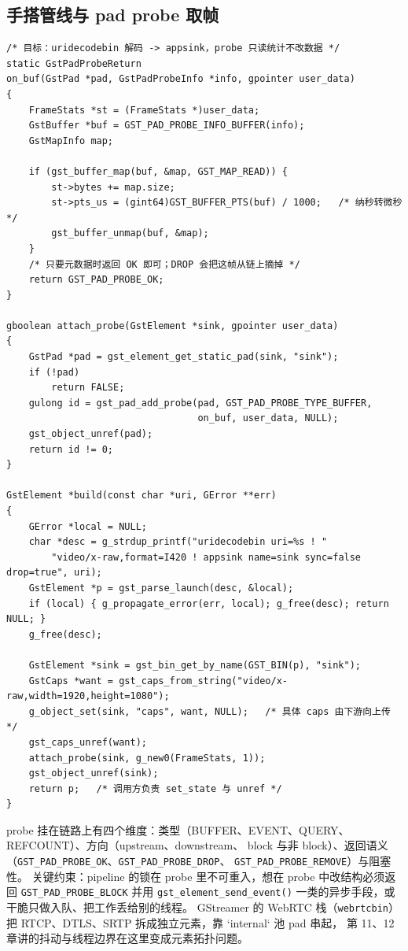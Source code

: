 \documentclass[12pt,a4paper,fontset=fandol]{ctexbook}
\newcommand{\Fn}[1]{\texttt{#1()}}
\newcommand{\Tp}[1]{\texttt{#1}}
\newcommand{\Bk}{\discretionary{}{}{}}
\begin{document}
\subsection*
{手搭管线与 pad probe 取帧}
\begin{lstlisting}[style=cstyle,caption={GStreamer：手搭管线、在 sink pad 上挂 probe 取帧并读取时钟},label={lst:ch13-gst-probe}]
/* 目标：uridecodebin 解码 -> appsink，probe 只读统计不改数据 */
static GstPadProbeReturn
on_buf(GstPad *pad, GstPadProbeInfo *info, gpointer user_data)
{
    FrameStats *st = (FrameStats *)user_data;
    GstBuffer *buf = GST_PAD_PROBE_INFO_BUFFER(info);
    GstMapInfo map;

    if (gst_buffer_map(buf, &map, GST_MAP_READ)) {
        st->bytes += map.size;
        st->pts_us = (gint64)GST_BUFFER_PTS(buf) / 1000;   /* 纳秒转微秒 */
        gst_buffer_unmap(buf, &map);
    }
    /* 只要元数据时返回 OK 即可；DROP 会把这帧从链上摘掉 */
    return GST_PAD_PROBE_OK;
}

gboolean attach_probe(GstElement *sink, gpointer user_data)
{
    GstPad *pad = gst_element_get_static_pad(sink, "sink");
    if (!pad)
        return FALSE;
    gulong id = gst_pad_add_probe(pad, GST_PAD_PROBE_TYPE_BUFFER,
                                  on_buf, user_data, NULL);
    gst_object_unref(pad);
    return id != 0;
}

GstElement *build(const char *uri, GError **err)
{
    GError *local = NULL;
    char *desc = g_strdup_printf("uridecodebin uri=%s ! "
        "video/x-raw,format=I420 ! appsink name=sink sync=false drop=true", uri);
    GstElement *p = gst_parse_launch(desc, &local);
    if (local) { g_propagate_error(err, local); g_free(desc); return NULL; }
    g_free(desc);

    GstElement *sink = gst_bin_get_by_name(GST_BIN(p), "sink");
    GstCaps *want = gst_caps_from_string("video/x-raw,width=1920,height=1080");
    g_object_set(sink, "caps", want, NULL);   /* 具体 caps 由下游向上传 */
    gst_caps_unref(want);
    attach_probe(sink, g_new0(FrameStats, 1));
    gst_object_unref(sink);
    return p;   /* 调用方负责 set_state 与 unref */
}
\end{lstlisting}

probe 挂在链路上有四个维度：类型（BUFFER、EVENT、QUERY、REFCOUNT）、方向（upstream、downstream、
block 与非 block）、返回语义（\Tp{GST\_{\Bk}PAD\_{\Bk}PROBE\_{\Bk}OK}、\Tp{GST\_{\Bk}PAD\_{\Bk}PROBE\_{\Bk}DROP}、
\Tp{GST\_{\Bk}PAD\_{\Bk}PROBE\_{\Bk}REMOVE}）与阻塞性。
关键约束：pipeline 的锁在 probe 里不可重入，想在 probe 中改结构必须返回 \Tp{GST\_{\Bk}PAD\_{\Bk}PROBE\_{\Bk}BLOCK}
并用 \Fn{gst\_{\Bk}element\_{\Bk}send\_{\Bk}event} 一类的异步手段，或干脆只做入队、把工作丢给别的线程。
GStreamer 的 WebRTC 栈（\Tp{webrtcbin}）把 RTCP、DTLS、SRTP 拆成独立元素，靠 `internal` 池 pad 串起，
第 11、12 章讲的抖动与线程边界在这里变成元素拓扑问题。
\end{document}
